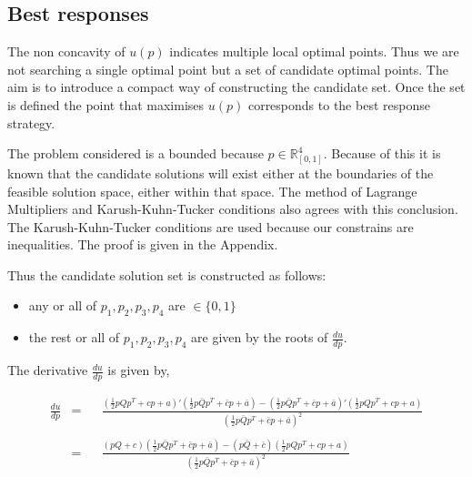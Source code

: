 \documentclass[10pt]{article}
\newcommand{\R}{\mathbb{R}}
\begin{document}
\subsection{Best responses}\label{section:memory_one_analytical}

The non concavity of \(u(p)\) indicates multiple local optimal points. Thus we
are not searching a single optimal point but a set of candidate optimal points.
The aim is to introduce a compact way of constructing the candidate set. Once
the set is defined the point that maximises \(u(p)\) corresponds to the best
response strategy.

The problem considered is a bounded because \(p \in \R^4_{[0, 1]}\). Because of
this it is known that the candidate solutions will exist either at the boundaries
of the feasible solution space, either within that space. The method of Lagrange
Multipliers and Karush-Kuhn-Tucker conditions also agrees with this conclusion. %
The Karush-Kuhn-Tucker conditions are used because our constrains are inequalities.
The proof is given in the Appendix.

Thus the candidate solution set is constructed as follows:

\begin{itemize}
    \item any or all of \(p_1, p_2, p_3, p_4\) are \(\in \{0, 1\}\)
    \item the rest or all of \(p_1, p_2, p_3, p_4\) are given by the roots of \(\frac{du}{dp}\).
\end{itemize}

The derivative \(\frac{du}{dp}\) is given by,

\begin{equation}\label{eq:derivative_of_quadratic}
    \begin{aligned}
     \frac{du}{dp} & = && \frac{(  \frac{1}{2}p  Q  p^T + c p + a)'
      (  \frac{1}{2} p  \bar{Q}  p^T + \bar{c}  p + \bar{a}) - 
      (  \frac{1}{2} p  \bar{Q}  p^T + \bar{c}  p + \bar{a})'
      (  \frac{1}{2} p  Q  p^T + c p + a)}
      {(  \frac{1}{2} p  \bar{Q}  p^T + \bar{c}  p + \bar{a})^2} \\
      \\
    & = && \frac{(pQ + c) ( \frac{1}{2} p  \bar{Q}  p^T + \bar{c}  p + \bar{a}) 
    - (p\bar{Q} + \bar{c})( \frac{1}{2} p  Q  p^T + c p + a)}
      {( \frac{1}{2} p  \bar{Q}  p^T + \bar{c}  p + \bar{a})^2} \\
    \end{aligned}
\end{equation}
\end{document}
